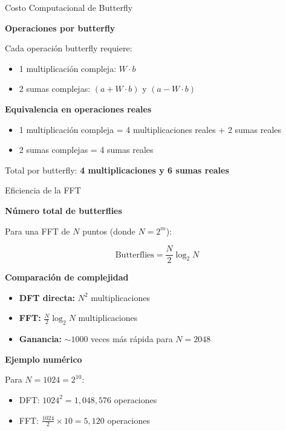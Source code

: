 \documentclass[aspectratio=169]{beamer}
\begin{document}
\begin{frame}{Costo Computacional de Butterfly}

\textbf{Operaciones por butterfly}

Cada operación butterfly requiere:

\begin{itemize}
    \item 1 multiplicación compleja: $W \cdot b$
    \item 2 sumas complejas: $(a + W \cdot b)$ y $(a - W \cdot b)$
\end{itemize}

\vspace{0.3cm}

\textbf{Equivalencia en operaciones reales}

\begin{itemize}
    \item 1 multiplicación compleja = 4 multiplicaciones reales + 2 sumas reales
    \item 2 sumas complejas = 4 sumas reales
\end{itemize}

Total por butterfly: \textbf{4 multiplicaciones y 6 sumas reales}

\end{frame}

\begin{frame}{Eficiencia de la FFT}

\textbf{Número total de butterflies}

Para una FFT de $N$ puntos (donde $N = 2^m$):

\[
\text{Butterflies} = \frac{N}{2} \log_2 N
\]

\vspace{0.1cm}

\textbf{Comparación de complejidad}

\begin{itemize}
    \item \textbf{DFT directa:} $N^2$ multiplicaciones
    \item \textbf{FFT:} $\frac{N}{2} \log_2 N$ multiplicaciones
    \item \textbf{Ganancia:} $\sim 1000$ veces más rápida para $N=2048$
\end{itemize}

\vspace{0.3cm}

\textbf{Ejemplo numérico}

Para $N = 1024 = 2^{10}$:
\begin{itemize}
    \item DFT: $1024^2 = 1,048,576$ operaciones
    \item FFT: $\frac{1024}{2} \times 10 = 5,120$ operaciones
\end{itemize}

\end{frame}
\end{document}
